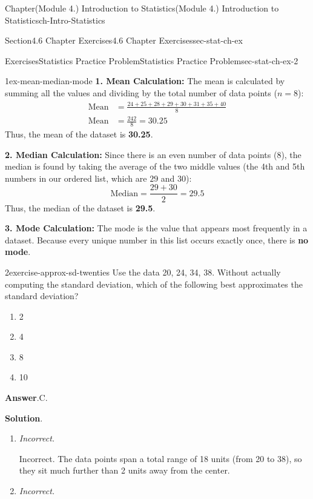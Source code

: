 \documentclass[oneside,10pt,]{book}
\newcommand{\blocktitlefont}{\relax}
\newcommand{\terminology}[1]{\textbf{#1}}
\newcommand{\lititle}[1]{{\slshape#1}}
\newcommand{\amp}{&}
\begin{document}
\begin{chapterptx}{Chapter}{(Module 4.) Introduction to Statistics}{}{(Module 4.) Introduction to Statistics}{}{}{ch-Intro-Statistics}
\begin{sectionptx}{Section}{4.6 Chapter Exercises}{}{4.6 Chapter Exercises}{}{}{sec-stat-ch-ex}
\begin{exercises-subsection-numberless}{Exercises}{Statistics Practice Problem}{}{Statistics Practice Problem}{}{}{sec-stat-ch-ex-2}
\begin{divisionexercise}{1}{}{}{ex-mean-median-mode}
\terminology{1. Mean Calculation:} The mean is calculated by summing all the values and dividing by the total number of data points (\(n = 8\)):%
\begin{align*}
\text{Mean} \amp = \frac{24 + 25 + 28 + 29 + 30 + 31 + 35 + 40}{8}\\
\text{Mean} \amp = \frac{242}{8} = 30.25
\end{align*}
Thus, the mean of the dataset is \terminology{30.25}.%
\par
\terminology{2. Median Calculation:} Since there is an even number of data points (\(8\)), the median is found by taking the average of the two middle values (the 4th and 5th numbers in our ordered list, which are \(29\) and \(30\)):%
\begin{equation*}
\text{Median} = \frac{29 + 30}{2} = 29.5
\end{equation*}
Thus, the median of the dataset is \terminology{29.5}.%
\par
\terminology{3. Mode Calculation:} The mode is the value that appears most frequently in a dataset. Because every unique number in this list occurs exactly once, there is \terminology{no mode}.%
\end{divisionexercise}%
\begin{divisionexercise}{2}{}{}{exercise-approx-sd-twenties}%
Use the data 20, 24, 34, 38. Without actually computing the standard deviation, which of the following best approximates the standard deviation?%
\par
%
\begin{enumerate}[label={\Alph*.}]
\item{}2%
\item{}4%
\item{}8%
\item{}10%
\end{enumerate}
%
\par\smallskip%
\noindent\textbf{\blocktitlefont Answer}.\hypertarget{exercise-approx-sd-twenties-2}{}\quad{}C.%
\par\smallskip%
\noindent\textbf{\blocktitlefont Solution}.\hypertarget{exercise-approx-sd-twenties-3}{}\quad{}%
\begin{enumerate}[label={\Alph*.}]
\item{}\lititle{Incorrect.}\par%
Incorrect. The data points span a total range of 18 units (from 20 to 38), so they sit much further than 2 units away from the center.%
\item{}\lititle{Incorrect.}\par%

\end{enumerate}
\end{divisionexercise}
\end{exercises-subsection-numberless}
\end{sectionptx}
\end{chapterptx}
\end{document}
